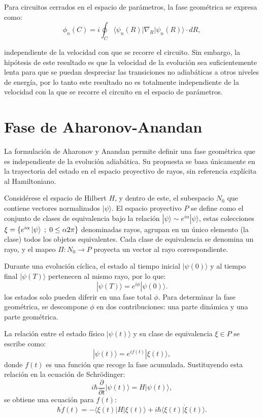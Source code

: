 Para circuitos cerrados en el espacio de parámetros, la fase geométrica se expresa como:
\begin{equation}\label{eq2:fg berry}
    \phi_n(C) = i \oint_C \langle \psi_n(R) | \nabla_R | \psi_n(R) \rangle \cdot dR,    
\end{equation}

independiente de la velocidad con que se recorre el circuito. Sin embargo, la hipótesis de este resultado es que la velocidad de la evoluci\'on sea suficientemente lenta para que se puedan despreciar las transiciones no adiab\'aticas a otros niveles de energ\'ia, por lo tanto este resultado no es totalmente independiente de la velocidad con la que se recorre el circuito en el espacio de parámetros.

\section{Fase de Aharonov-Anandan}\label{sec2:fase AA}

La formulación de Aharonov y Anandan permite definir una fase geométrica que es independiente de la evolución adiabática. Su propuesta se basa únicamente en la trayectoria del estado en el espacio proyectivo de rayos, sin referencia explícita al Hamiltoniano.

Considérese el espacio de Hilbert \( H \), y dentro de este, el subespacio \( N_0 \) que contiene vectores normalizados \( | \psi \rangle \). El espacio proyectivo \( P \) se define como el conjunto de clases de equivalencia bajo la relación \( | \psi \rangle \sim e^{i\alpha} | \psi \rangle \), estas colecciones $\xi = \{e^{i\alpha}\ket{\psi} \; ; \; 0 \leq \alpha 2\pi\}$ denominadas rayos, agrupan en un \'unico elemento (la clase) todos los objetos equivalentes. Cada clase de equivalencia se denomina un rayo, y el mapeo \( \Pi : N_0 \to P \) proyecta un vector al rayo correspondiente.

Durante una evolución cíclica, el estado al tiempo inicial \( | \psi(0) \rangle \) y al tiempo final \( | \psi(T) \rangle \) pertenecen al mismo rayo, por lo que:
\[
| \psi(T) \rangle = e^{i\phi} | \psi(0) \rangle.
\]
los estados solo pueden diferir en una fase total $\phi$. Para determinar la fase geométrica, se descompone \( \phi \) en dos contribuciones: una parte dinámica y una parte geométrica.

La relación entre el estado físico \( | \psi(t) \rangle \) y su clase de equivalencia \( \xi \in P \) se escribe como:
\[
| \psi(t) \rangle = e^{i f(t)} | \xi(t) \rangle,
\]
donde \( f(t) \) es una función que recoge la fase acumulada. Sustituyendo esta relación en la ecuación de Schrödinger:
\[
i \hbar \frac{\partial}{\partial t} | \psi(t) \rangle = H | \psi(t) \rangle,
\]
se obtiene una ecuación para \( f(t) \):
\[
\hbar \dot{f}(t) = -\langle \xi(t) | H | \xi(t) \rangle + i \hbar \langle \xi(t) | \dot{\xi}(t) \rangle.
\]

